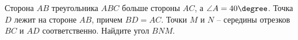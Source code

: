 \begin{ex}
	\begin{condition} 
		Сторона \( AB  \) треугольника \( ABC \) больше стороны \( AC \), а \( \angle A = 40\degree \). Точка \( D  \) лежит на стороне \( AB \), причем \( BD = AC \). Точки \( M \) и \( N \) – середины отрезков \( BC  \) и \( AD  \) соответственно. Найдите угол \( BNM \).
	\end{condition}
	\answer{\( 20\degree \)}
\end{ex}